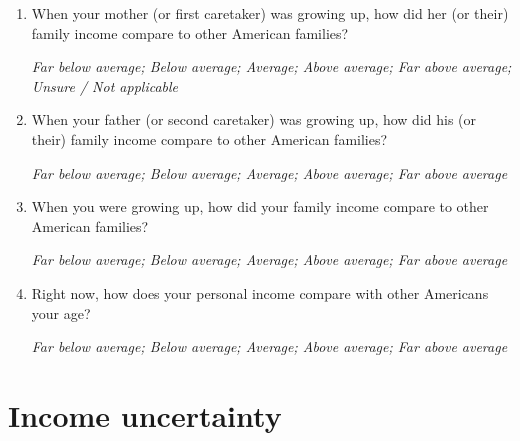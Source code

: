 \documentclass[11pt, headsepline]{article}
\begin{document}
\begin{enumerate}[resume]

    \item When your mother (or first caretaker) was growing up, how did her (or their) family income compare to other American families?

    \textit{Far below average; Below average; Average; Above average; Far above average; Unsure / Not applicable}

    \item When your father (or second caretaker) was growing up, how did his (or their) family income compare to other American families?

    \textit{Far below average; Below average; Average; Above average; Far above average}

    \item When you were growing up, how did your family income compare to other American families?

    \textit{Far below average; Below average; Average; Above average; Far above average}

    \item Right now, how does your personal income compare with other Americans your age?

    \textit{Far below average; Below average; Average; Above average; Far above average}
    
\end{enumerate}

\section*{Income uncertainty}
\end{document}
